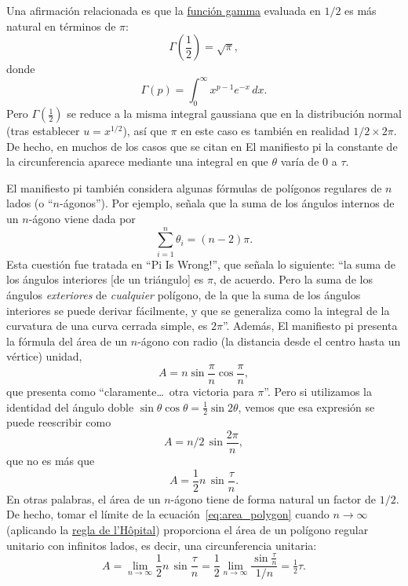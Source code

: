 Una afirmación relacionada es que la \href{http://mathworld.wolfram.com/GammaFunction.html}{función gamma} evaluada en $1/2$ es más natural en términos de $\pi$:
\[
\Gamma(\textstyle{\frac{1}{2}}) = \sqrt{\pi},
\]
donde
\begin{equation}
\label{eq:gamma}
\Gamma(p) = \int_{0}^{\infty} x^{p-1} e^{-x}\,dx.
\end{equation}
Pero $\Gamma(\frac{1}{2})$ se reduce a la misma integral gaussiana que en la distribución normal (tras establecer $u = x^{1/2}$), así que $\pi$ en este caso es también en realidad $1/2\times 2\pi$. De hecho, en muchos de los casos que se citan en El manifiesto pi la constante de la circunferencia aparece mediante una integral en que $\theta$ varía de $0$ a $\tau$.

El manifiesto pi también considera algunas fórmulas de polígonos regulares de
$n$ lados (o ``$n$-ágonos''). Por ejemplo, señala que la suma de los ángulos internos de un $n$-ágono viene dada por
\[
\sum_{i=1}^n \theta_i=(n-2)\pi.
\]
Esta cuestión fue tratada en ``Pi Is Wrong!'', que señala lo siguiente: ``la suma de los ángulos interiores [de un triángulo] es $\pi$, de acuerdo. Pero la suma de los ángulos \emph{exteriores} de \emph{cualquier} polígono, de la que la suma de los ángulos interiores se puede derivar fácilmente, y que se generaliza como la integral de la curvatura de una curva cerrada simple, es $2\pi$''. Además, El manifiesto pi presenta la fórmula del área de un $n$-ágono con radio (la distancia desde el centro hasta un vértice) unidad,
\[ A=n\sin\frac{\pi}{n}\cos\frac{\pi}{n}, \]
que presenta como ``claramente\ldots\ otra victoria para $\pi$''. Pero si utilizamos la identidad del ángulo doble $\sin\theta\cos\theta = \frac{1}{2} \sin 2\theta$, vemos que esa expresión se puede reescribir como
\[ A = n/2\, \sin\frac{2\pi}{n}, \]
que no es más que
\begin{equation}
\label{eq:area_polygon}
A = \frac{1}{2} n\, \sin\frac{\tau}{n}.
\end{equation}
En otras palabras, el área de un $n$-ágono tiene de forma natural un factor de $1/2$. De hecho, tomar el límite de la ecuación~\eqref{eq:area_polygon} cuando $n\rightarrow \infty$ (aplicando la \href{http://mathworld.wolfram.com/LHospitalsRule.html}{regla de l'H\^{o}pital}) proporciona el área de un polígono regular unitario con infinitos lados, es decir, una circunferencia unitaria:
\begin{equation}
\label{eq:lhopital}
A = \lim_{n\rightarrow\infty} \frac{1}{2} n\, \sin\frac{\tau}{n}
= \frac{1}{2} \lim_{n\rightarrow\infty} \frac{\sin\frac{\tau}{n}}{1/n} = \tfrac{1}{2}\tau.
\end{equation}


